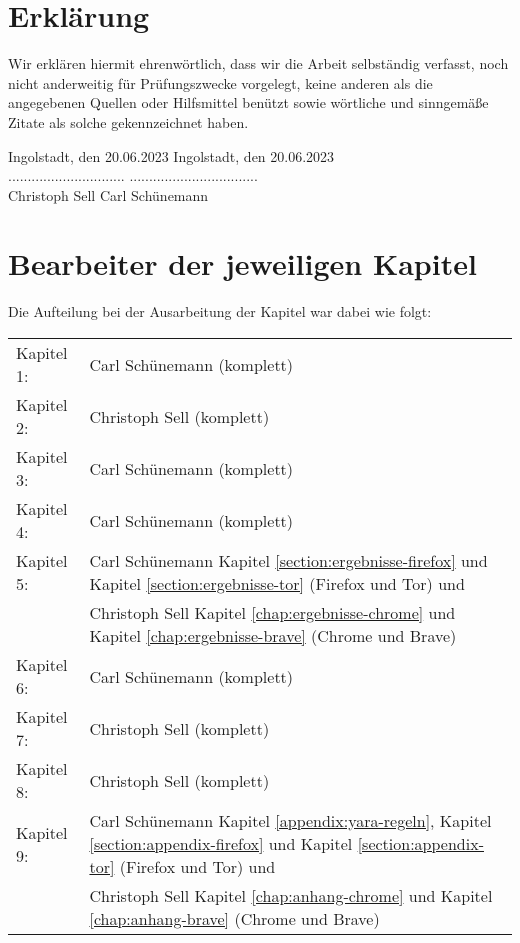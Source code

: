 \chapter*{Erklärung}

Wir erklären hiermit ehrenwörtlich, dass wir die Arbeit selbständig verfasst, noch nicht anderweitig für Prüfungszwecke vorgelegt, keine anderen als die angegebenen Quellen oder Hilfsmittel benützt sowie wörtliche und sinngemäße Zitate als solche gekennzeichnet haben.

\vspace{2cm}

Ingolstadt, den 20.06.2023 		\hfill Ingolstadt, den 20.06.2023			\\

\vspace{0.8cm}
.............................. 	\hfill .................................	\\
Christoph Sell 					\hfill Carl Schünemann						\\


\chapter*{Bearbeiter der jeweiligen Kapitel}

Die Aufteilung bei der Ausarbeitung der Kapitel war dabei wie folgt:

\begin{tabular}{ll}
	Kapitel 1:	& Carl Schünemann (komplett)																																	\tabularnewline
	Kapitel 2:	& Christoph Sell (komplett)																																		\tabularnewline
	Kapitel 3:	& Carl Schünemann (komplett)																																	\tabularnewline
	Kapitel 4:	& Carl Schünemann (komplett)																																	\tabularnewline
	Kapitel 5:	& Carl Schünemann Kapitel \ref{section:ergebnisse-firefox} und Kapitel \ref{section:ergebnisse-tor}  (Firefox und Tor) und 										\tabularnewline
				& Christoph Sell  Kapitel \ref{chap:ergebnisse-chrome} und Kapitel \ref{chap:ergebnisse-brave} (Chrome und Brave) 												\tabularnewline
	Kapitel 6:	& Carl Schünemann (komplett)																																	\tabularnewline
	Kapitel 7:	& Christoph Sell (komplett)																																		\tabularnewline
	Kapitel 8:	& Christoph Sell (komplett)																																		\tabularnewline
	Kapitel 9:	& Carl Schünemann Kapitel \ref{appendix:yara-regeln}, Kapitel \ref{section:appendix-firefox} und Kapitel \ref{section:appendix-tor} (Firefox und Tor) und 		\tabularnewline
				& Christoph Sell Kapitel \ref{chap:anhang-chrome} und Kapitel \ref{chap:anhang-brave} (Chrome und Brave) 														\tabularnewline
	\end{tabular}


